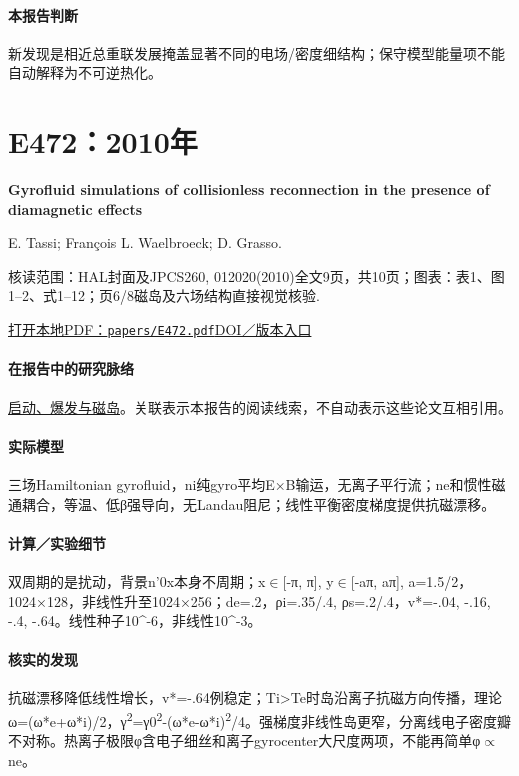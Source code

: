 \paragraph{本报告判断}新发现是相近总重联发展掩盖显著不同的电场/密度细结构；保守模型能量项不能自动解释为不可逆热化。

\section{E472：2010年}\label{paper:E472}

\textbf{Gyrofluid simulations of collisionless reconnection in the presence of diamagnetic effects}\citep{E472}\

E. Tassi;  François L. Waelbroeck;  D. Grasso.

\textsf{核读范围：}HAL封面及JPCS260, 012020(2010)全文9页，共10页；\textsf{图表：}表1、图1–2、式1–12；页6/8磁岛及六场结构直接视觉核验.

\href{run:papers/E472.pdf}{打开本地PDF：\texttt{papers/E472.pdf}}\quad\href{http://porto.polito.it/2380084/1/2380084.pdf}{DOI／版本入口}

\paragraph{在报告中的研究脉络}\hyperref[story:onset]{启动、爆发与磁岛}。关联表示本报告的阅读线索，不自动表示这些论文互相引用。

\paragraph{实际模型}三场Hamiltonian gyrofluid，ni纯gyro平均E×B输运，无离子平行流；ne和惯性磁通耦合，等温、低β强导向，无Landau阻尼；线性平衡密度梯度提供抗磁漂移。

\paragraph{计算／实验细节}双周期的是扰动，背景n'0x本身不周期；x\ensuremath{\in}[-π, π], y\ensuremath{\in}[-aπ, aπ], a=1.5/2，1024×128，非线性升至1024×256；de=.2，ρi=.35/.4, ρs=.2/.4，v*=-.04, -.16, -.4, -.64。线性种子10\textasciicircum{}-6，非线性10\textasciicircum{}-3。

\paragraph{核实的发现}抗磁漂移降低线性增长，v*=-.64例稳定；Ti>Te时岛沿离子抗磁方向传播，理论ω=(ω*e+ω*i)/2，γ\textsuperscript{2}=γ0\textsuperscript{2}-(ω*e-ω*i)\textsuperscript{2}/4。强梯度非线性岛更窄，分离线电子密度瓣不对称。热离子极限φ含电子细丝和离子gyrocenter大尺度两项，不能再简单φ\ensuremath{\propto}ne。

